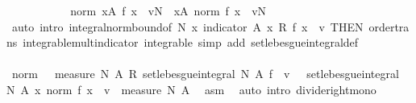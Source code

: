 \begin{isabellebody}
\ \ \ \ \ \ \ \ \isamarkupfalse%
\ \isamarkupfalse%
\ {\isachardoublequoteopen}norm\ {\isacharparenleft}{\kern0pt}{\isasymintegral}x{\isasymin}A{\isachardot}{\kern0pt}\ {\isacharparenleft}{\kern0pt}f\ x\ {\isacharminus}{\kern0pt}\ v{\isacharparenright}{\kern0pt}{\isasympartial}N{\isacharparenright}{\kern0pt}\ {\isasymle}\ {\isacharparenleft}{\kern0pt}{\isasymintegral}x{\isasymin}A{\isachardot}{\kern0pt}\ norm\ {\isacharparenleft}{\kern0pt}f\ x\ {\isacharminus}{\kern0pt}\ v{\isacharparenright}{\kern0pt}{\isasympartial}N{\isacharparenright}{\kern0pt}{\isachardoublequoteclose}\ \isamarkupfalse%
\ {\isacharasterisk}{\kern0pt}\ \isamarkupfalse%
\ {\isacharparenleft}{\kern0pt}auto\ intro{\isacharbang}{\kern0pt}{\isacharcolon}{\kern0pt}\ integral{\isacharunderscore}{\kern0pt}norm{\isacharunderscore}{\kern0pt}bound{\isacharbrackleft}{\kern0pt}of\ N\ {\isachardoublequoteopen}{\isasymlambda}x{\isachardot}{\kern0pt}\ indicator\ A\ x\ {\isacharasterisk}{\kern0pt}\isactrlsub R\ {\isacharparenleft}{\kern0pt}f\ x\ {\isacharminus}{\kern0pt}\ v{\isacharparenright}{\kern0pt}{\isachardoublequoteclose}{\isacharcomma}{\kern0pt}\ THEN\ order{\isacharunderscore}{\kern0pt}trans{\isacharbrackright}{\kern0pt}\ integrable{\isacharunderscore}{\kern0pt}mult{\isacharunderscore}{\kern0pt}indicator\ integrable\ simp\ add{\isacharcolon}{\kern0pt}\ set{\isacharunderscore}{\kern0pt}lebesgue{\isacharunderscore}{\kern0pt}integral{\isacharunderscore}{\kern0pt}def{\isacharparenright}{\kern0pt}\isanewline
\ \ \ \ \ \ \ \ \isamarkupfalse%
\ \isamarkupfalse%
\ {\isachardoublequoteopen}norm\ {\isacharparenleft}{\kern0pt}{\isacharparenleft}{\kern0pt}{}\ {\isacharslash}{\kern0pt}\ measure\ N\ A{\isacharparenright}{\kern0pt}\ {\isacharasterisk}{\kern0pt}\isactrlsub R\ set{\isacharunderscore}{\kern0pt}lebesgue{\isacharunderscore}{\kern0pt}integral\ N\ A\ f\ {\isacharminus}{\kern0pt}\ v{\isacharparenright}{\kern0pt}\ {\isasymle}\ \ set{\isacharunderscore}{\kern0pt}lebesgue{\isacharunderscore}{\kern0pt}integral\ N\ A\ {\isacharparenleft}{\kern0pt}{\isasymlambda}x{\isachardot}{\kern0pt}\ norm\ {\isacharparenleft}{\kern0pt}f\ x\ {\isacharminus}{\kern0pt}\ v{\isacharparenright}{\kern0pt}{\isacharparenright}{\kern0pt}\ {\isacharslash}{\kern0pt}\ measure\ N\ A{\isachardoublequoteclose}\ \isamarkupfalse%
\ asm\ \isamarkupfalse%
\ {\isacharparenleft}{\kern0pt}auto\ intro{\isacharcolon}{\kern0pt}\ divide{\isacharunderscore}{\kern0pt}right{\isacharunderscore}{\kern0pt}mono{\isacharparenright}{\kern0pt}\isanewline

\end{isabellebody}
